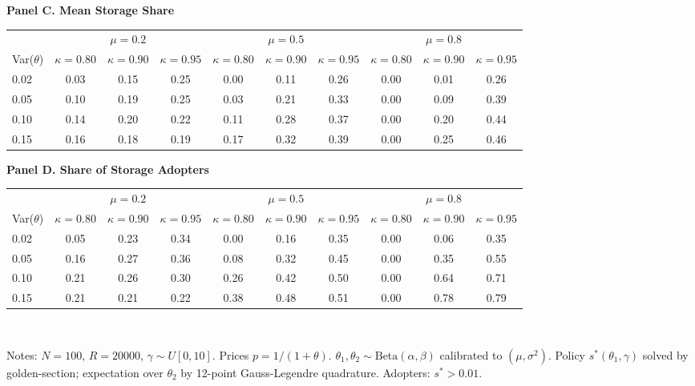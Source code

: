 \begin{table}[ht!]
\begin{threeparttable}
\vspace{0.35em}
\noindent\textbf{Panel C. Mean Storage Share}
\vspace{0.25em}
\begin{tabular}{l|ccc|ccc|ccc}
\toprule
 & \multicolumn{3}{c|}{$\mu=0.2$} & \multicolumn{3}{c|}{$\mu=0.5$} & \multicolumn{3}{c}{$\mu=0.8$} \\
Var($\theta$) & $\kappa=0.80$ & $\kappa=0.90$ & $\kappa=0.95$ & $\kappa=0.80$ & $\kappa=0.90$ & $\kappa=0.95$ & $\kappa=0.80$ & $\kappa=0.90$ & $\kappa=0.95$ \\
\midrule
0.02 & 0.03 & 0.15 & 0.25 & 0.00 & 0.11 & 0.26 & 0.00 & 0.01 & 0.26 \\
0.05 & 0.10 & 0.19 & 0.25 & 0.03 & 0.21 & 0.33 & 0.00 & 0.09 & 0.39 \\
0.10 & 0.14 & 0.20 & 0.22 & 0.11 & 0.28 & 0.37 & 0.00 & 0.20 & 0.44 \\
0.15 & 0.16 & 0.18 & 0.19 & 0.17 & 0.32 & 0.39 & 0.00 & 0.25 & 0.46 \\
\bottomrule
\end{tabular}

\vspace{0.35em}
\noindent\textbf{Panel D. Share of Storage Adopters}
\vspace{0.25em}
\begin{tabular}{l|ccc|ccc|ccc}
\toprule
 & \multicolumn{3}{c|}{$\mu=0.2$} & \multicolumn{3}{c|}{$\mu=0.5$} & \multicolumn{3}{c}{$\mu=0.8$} \\
Var($\theta$) & $\kappa=0.80$ & $\kappa=0.90$ & $\kappa=0.95$ & $\kappa=0.80$ & $\kappa=0.90$ & $\kappa=0.95$ & $\kappa=0.80$ & $\kappa=0.90$ & $\kappa=0.95$ \\
\midrule
0.02 & 0.05 & 0.23 & 0.34 & 0.00 & 0.16 & 0.35 & 0.00 & 0.06 & 0.35 \\
0.05 & 0.16 & 0.27 & 0.36 & 0.08 & 0.32 & 0.45 & 0.00 & 0.35 & 0.55 \\
0.10 & 0.21 & 0.26 & 0.30 & 0.26 & 0.42 & 0.50 & 0.00 & 0.64 & 0.71 \\
0.15 & 0.21 & 0.21 & 0.22 & 0.38 & 0.48 & 0.51 & 0.00 & 0.78 & 0.79 \\
\bottomrule
\end{tabular}
\
\begin{tablenotes}[flushleft]
\footnotesize
\item Notes: $N=100$, $R=20000$, $\gamma\sim U[0,10]$. Prices $p=1/(1+\theta)$. $\theta_1,\theta_2\sim \text{Beta}(\alpha,\beta)$ calibrated to $(\mu,\sigma^2)$. Policy $s^*(\theta_1,\gamma)$ solved by golden-section; expectation over $\theta_2$ by 12-point Gauss-Legendre quadrature. Adopters: $s^*>0.01$.
\end{tablenotes}
\end{threeparttable}
\end{table}
